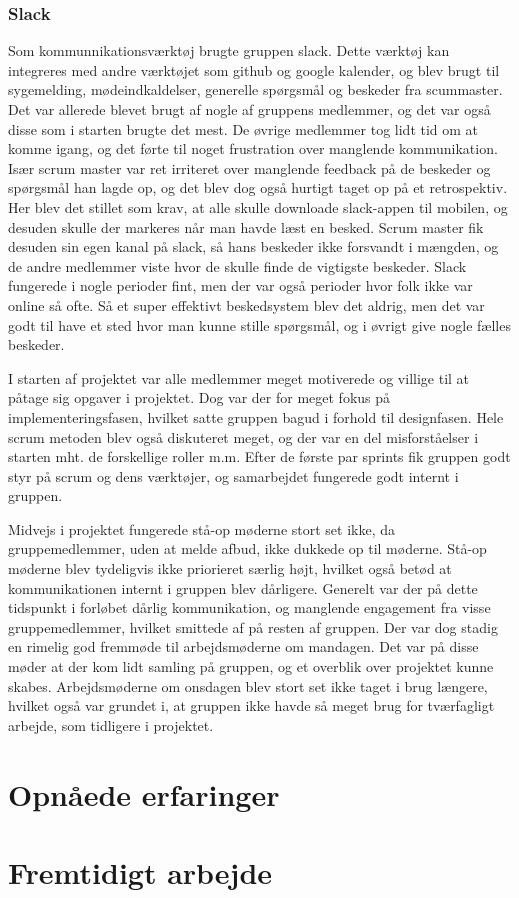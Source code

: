 \subsubsection{Slack}
Som kommunnikationsværktøj brugte gruppen slack. Dette værktøj kan integreres med andre værktøjet som github og google kalender, og blev brugt til sygemelding, mødeindkaldelser, generelle spørgsmål og beskeder fra scummaster. Det var allerede blevet brugt af nogle af gruppens medlemmer, og det var også disse som i starten brugte det mest. De øvrige medlemmer tog lidt tid om at komme igang, og det førte til noget frustration over manglende kommunikation. Især scrum master var ret irriteret over manglende feedback på de beskeder og spørgsmål han lagde op, og det blev dog også hurtigt taget op på et retrospektiv. Her blev det stillet som krav, at alle skulle downloade slack-appen til mobilen, og desuden skulle der markeres når man havde læst en besked. Scrum master fik desuden sin egen kanal på slack, så hans beskeder ikke forsvandt i mængden, og de andre medlemmer viste hvor de skulle finde de vigtigste 
beskeder. Slack fungerede i nogle perioder fint, men der var også perioder hvor folk ikke var online så ofte. Så et super effektivt beskedsystem blev det aldrig, men det var godt til have et sted hvor man kunne stille spørgsmål, og i øvrigt give nogle fælles beskeder.

I starten af projektet var alle medlemmer meget motiverede og villige til at påtage sig opgaver i projektet. Dog var der for meget fokus på implementeringsfasen, hvilket satte gruppen bagud i forhold til designfasen. Hele scrum metoden blev også diskuteret meget, og der var en del misforståelser i starten mht. de forskellige roller m.m. Efter de første par sprints fik gruppen godt styr på scrum og dens værktøjer, og samarbejdet fungerede godt internt i gruppen.

Midvejs i projektet fungerede stå-op møderne stort set ikke, da gruppemedlemmer, uden at melde afbud, ikke dukkede op til møderne. Stå-op møderne blev tydeligvis ikke priorieret særlig højt, hvilket også betød at kommunikationen internt i gruppen blev dårligere. Generelt var der på dette tidspunkt i forløbet dårlig kommunikation, og manglende engagement fra visse gruppemedlemmer, hvilket smittede af på resten af gruppen.
Der var dog stadig en rimelig god fremmøde til arbejdsmøderne om mandagen. Det var på disse møder at der kom lidt samling på gruppen, og et overblik over projektet kunne skabes. Arbejdsmøderne om onsdagen blev stort set ikke taget i brug længere, hvilket også var grundet i, at gruppen ikke havde så meget brug for tværfagligt arbejde, som tidligere i projektet.

\section{Opnåede erfaringer}

\section{Fremtidigt arbejde}
